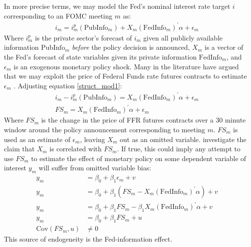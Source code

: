 \documentclass[a4paper,man,floatsintext,natbib]{apa6}
\begin{document}
	In more precise terms, we may model the Fed's nominal interest rate target \(i\) corresponding to an FOMC meeting \(m\) as:
	\begin{align*}
		i_m = i_m^p(\text{PubInfo}_m) + X_m(\text{FedInfo}_m)^\prime \alpha + \epsilon_m \tag{2} \label{struct_mod1}
	\end{align*}
	Where \(i_m^p\) is the private sector's forecast of \(i_m\) given all publicly available information \(\text{PubInfo}_m\) \textit{before} the policy decision is announced, \(X_m\) is a vector of the Fed's forecast of state variables given its private information \(\text{FedInfo}_m\), and \(\epsilon_m\) is an exogenous monetary policy shock. Many in the literature have argued that we may exploit the price of Federal Funds rate futures contracts to estimate \(\epsilon_m\) \citep{Gurkaynak2011,Gertler2015, Nakamura2018}. Adjusting equation \ref{struct_mod1}:
	\begin{align*}
		i_m - i_m^p(\text{PubInfo}_m) = X_m(\text{FedInfo}_m)^\prime \alpha + \epsilon_m \\
		FS_m = X_m(\text{FedInfo}_m)^\prime \alpha + \epsilon_m \tag{3} \label{model}
	\end{align*}
	Where \(FS_m\) is the change in the price of FFR futures contracts over a 30 minute window around the policy announcement corresponding to meeting \(m\). \(FS_m\) is used as an estimate of \(\epsilon_m\), leaving \(X_m\) out as an omitted variable. \cite{Bauer2020} investigate the claim that \(X_m\) is correlated with \(FS_m\). If true, this could imply any attempt to use \(FS_m\) to estimate the effect of monetary policy on some dependent variable of interest \(y_m\) will suffer from omitted variable bias:
	\begin{align*}
		y_m &= \beta_0 + \beta_1 \epsilon_m  + v \\
		y_m &= \beta_0 + \beta_1(FS_m - X_m(\text{FedInfo}_m)^\prime \alpha )  + v \\
		y_m &= \beta_0 + \beta_1FS_m - \beta_1 X_m(\text{FedInfo}_m)^\prime \alpha + v \\
		y_m &= \beta_0 + \beta_1FS_m + u \tag{4} \label{eq3} \\ 
		\mathrm{Cov}(FS_m, u) &\neq 0 
	\end{align*}
	This source of endogeneity is the Fed-information effect.
\end{document}
